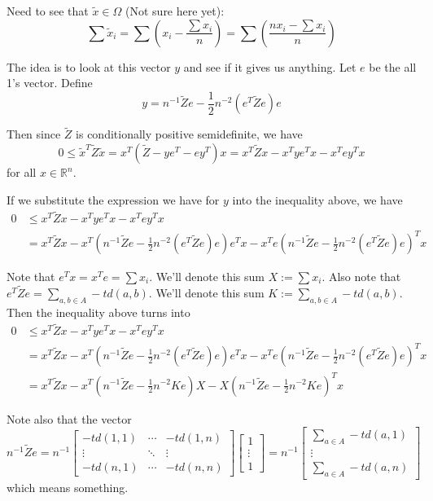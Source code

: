 \documentclass[11pt]{article}
\theoremstyle{definition}
\theoremstyle{definition}
\theoremstyle{plain}
\theoremstyle{plain}
\theoremstyle{plain}
\theoremstyle{definition}
\begin{document}
Need to see that $\tilde{x} \in \Omega$ (Not sure here yet):
\begin{equation*}
\sum \tilde{x}_i = \sum \left(x_i - \frac{\sum x_i}{n}\right) = \sum\left(\frac{nx_i - \sum x_i}{n}\right)
\end{equation*}

The idea is to look at this vector $y$ and see if it gives us anything. Let $e$ be the all 1's vector. Define
\begin{equation*}
y = n^{-1}\tilde{Z}e - \frac{1}{2}n^{-2}(e^T\tilde{Z}e)e
\end{equation*}

Then since $\tilde{Z}$ is conditionally positive semidefinite, we have
\begin{equation*}
0 \leq \tilde{x}^T\tilde{Z}\tilde{x} = x^T(\tilde{Z} - ye^T - ey^T)x = x^T\tilde{Z}x - x^Tye^Tx - x^Tey^Tx
\end{equation*}
for all $x \in \mathbb{R}^n$.

If we substitute the expression we have for $y$ into the inequality above, we have
\begin{align*}
0 &\leq x^T\tilde{Z}x - x^Tye^Tx - x^Tey^Tx \\
&= x^T\tilde{Z}x - x^T\left(n^{-1}\tilde{Z}e - \frac{1}{2}n^{-2}(e^T\tilde{Z}e)e\right)e^Tx - x^Te\left(n^{-1}\tilde{Z}e-\frac{1}{2}n^{-2}(e^T\tilde{Z}e)e\right)^Tx
\end{align*}

Note that $e^Tx = x^Te = \sum x_i$. We'll denote this sum $X:=\sum x_i$. Also note that $e^T\tilde{Z}e = \sum\limits_{a,b\in A} -td(a,b)$. We'll denote this sum $K := \sum\limits_{a,b\in A} -td(a,b)$. Then the inequality above turns into
\begin{align*}
0 &\leq x^T\tilde{Z}x - x^Tye^Tx - x^Tey^Tx \\
&= x^T\tilde{Z}x - x^T\left(n^{-1}\tilde{Z}e - \frac{1}{2}n^{-2}(e^T\tilde{Z}e)e\right)e^Tx - x^Te\left(n^{-1}\tilde{Z}e-\frac{1}{2}n^{-2}(e^T\tilde{Z}e)e\right)^Tx \\
&= x^T\tilde{Z}x - x^T\left(n^{-1}\tilde{Z}e - \frac{1}{2}n^{-2}Ke\right)X - X\left(n^{-1}\tilde{Z}e-\frac{1}{2}n^{-2}Ke\right)^Tx
\end{align*}

Note also that the vector
\begin{equation*}
n^{-1}\tilde{Z}e = n^{-1}\begin{bmatrix}
-td(1,1) & \cdots & -td(1,n) \\
\vdots & \ddots & \vdots \\
-td(n,1) & \cdots & -td(n,n)
\end{bmatrix}\begin{bmatrix}
1 \\ \vdots \\ 1
\end{bmatrix} = n^{-1}\begin{bmatrix}
\sum_{a \in A} -td(a,1) \\ \vdots \\ \sum_{a \in A} -td(a,n)
\end{bmatrix}
\end{equation*}
which means something.

\nocite{*}


\end{document}
